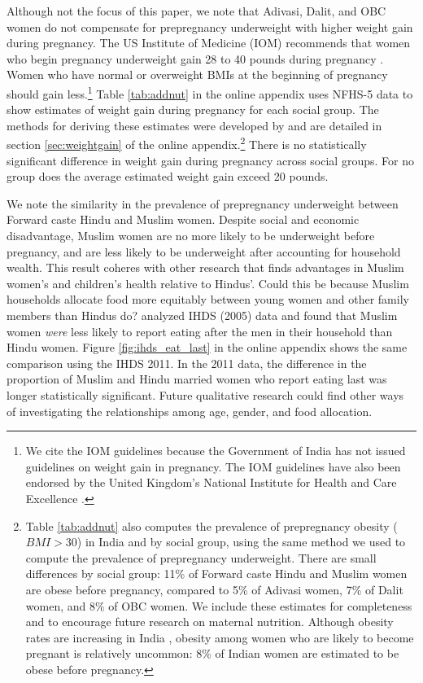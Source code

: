 Although not the focus of this paper, we note that Adivasi, Dalit, and OBC women do not compensate for prepregnancy underweight with higher weight gain during pregnancy.  The US Institute of Medicine (IOM) recommends that women who begin pregnancy underweight gain 28 to 40 pounds during pregnancy \citep{iom2009weightgain}. Women who have normal or overweight BMIs at the beginning of pregnancy should gain less.\footnote{We cite the IOM guidelines because the Government of India has not issued guidelines on weight gain in pregnancy. The IOM guidelines have also been endorsed by the United Kingdom's National Institute for Health and Care Excellence \citep{NICE2025}.}  Table \ref{tab:addnut} in the online appendix uses NFHS-5 data to show estimates of weight gain during pregnancy for each social group. The methods for deriving these estimates were developed by \cite{coffey2015prepregnancy} and are detailed in section \ref{sec:weightgain} of the online appendix.\footnote{Table \ref{tab:addnut} also computes the prevalence of prepregnancy obesity ($BMI>30$) in India and by social group, using the same method we used to compute the prevalence of prepregnancy underweight.  There are small differences by social group: 11\% of Forward caste Hindu and Muslim women are obese before pregnancy, compared to 5\% of Adivasi women, 7\% of Dalit women, and 8\% of OBC women.  We include these estimates for completeness and to encourage future research on maternal nutrition.  Although obesity rates are increasing in India \citep{luhar2020forecasting}, obesity among women who are likely to become pregnant is relatively uncommon: 8\% of Indian women are estimated to be obese before pregnancy.} There is no statistically significant difference in weight gain during pregnancy across social groups.  For no group does the average estimated weight gain exceed 20 pounds. 

We note the similarity in the prevalence of prepregnancy underweight between Forward caste Hindu and Muslim women.  Despite social and economic disadvantage, Muslim women are no more likely to be underweight before pregnancy, and are less likely to be underweight after accounting for household wealth.  This result coheres with other research that finds advantages in Muslim women's and children's health relative to Hindus'. Could this be because Muslim households allocate food more equitably between young women and other family members than Hindus do?  \cite{desai2014muslim} analyzed IHDS (2005) data and found that Muslim women \emph{were} less likely to report eating after the men in their household than Hindu women.  Figure \ref{fig:ihds_eat_last} in the online appendix shows the same comparison using the IHDS 2011.  In the 2011 data, the difference in the proportion of Muslim and Hindu married women who report eating last was longer statistically significant.  Future qualitative research could find other ways of investigating the relationships among age, gender, and food allocation.

